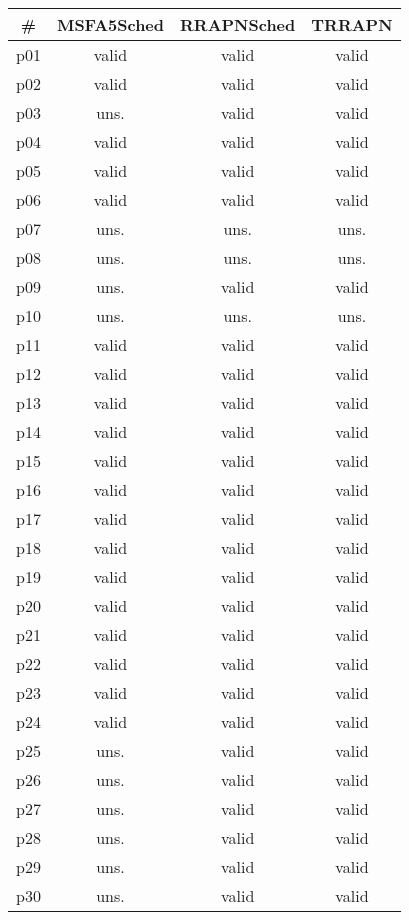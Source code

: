 \begin{tabular}{cccc}
\toprule
\textbf{\#} & \textbf{MSFA5Sched} & \textbf{RRAPNSched} & \textbf{TRRAPN}\\
\midrule
p01 & valid & valid & valid\\
p02 & valid & valid & valid\\
p03 & uns. & valid & valid\\
p04 & valid & valid & valid\\
p05 & valid & valid & valid\\
p06 & valid & valid & valid\\
p07 & uns. & uns. & uns.\\
p08 & uns. & uns. & uns.\\
p09 & uns. & valid & valid\\
p10 & uns. & uns. & uns.\\
p11 & valid & valid & valid\\
p12 & valid & valid & valid\\
p13 & valid & valid & valid\\
p14 & valid & valid & valid\\
p15 & valid & valid & valid\\
p16 & valid & valid & valid\\
p17 & valid & valid & valid\\
p18 & valid & valid & valid\\
p19 & valid & valid & valid\\
p20 & valid & valid & valid\\
p21 & valid & valid & valid\\
p22 & valid & valid & valid\\
p23 & valid & valid & valid\\
p24 & valid & valid & valid\\
p25 & uns. & valid & valid\\
p26 & uns. & valid & valid\\
p27 & uns. & valid & valid\\
p28 & uns. & valid & valid\\
p29 & uns. & valid & valid\\
p30 & uns. & valid & valid\\
\bottomrule
\end{tabular}

